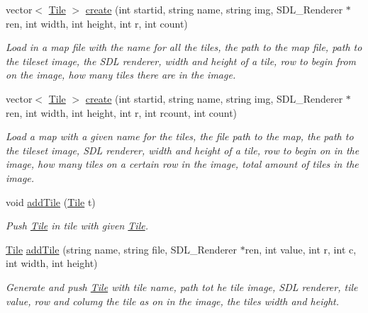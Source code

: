 \begin{DoxyCompactItemize}
\mbox{\label{classTileset_a9d93cb00fc20938748075d94be118ed6}} 
vector$<$ \hyperlink{classTile}{Tile} $>$ \hyperlink{classTileset_a9d93cb00fc20938748075d94be118ed6}{create} (int startid, string name, string img, S\+D\+L\+\_\+\+Renderer $\ast$ren, int width, int height, int r, int count)
\begin{DoxyCompactList}\small\item\em Load in a map file with the name for all the tiles, the path to the map file, path to the tileset image, the S\+DL renderer, width and height of a tile, row to begin from on the image, how many tiles there are in the image. \end{DoxyCompactList}\item 
\mbox{\label{classTileset_a7671c66fd7dfd4cf62524a5d518afbe6}} 
vector$<$ \hyperlink{classTile}{Tile} $>$ \hyperlink{classTileset_a7671c66fd7dfd4cf62524a5d518afbe6}{create} (int startid, string name, string img, S\+D\+L\+\_\+\+Renderer $\ast$ren, int width, int height, int r, int rcount, int count)
\begin{DoxyCompactList}\small\item\em Load a map with a given name for the tiles, the file path to the map, the path to the tileset image, S\+DL renderer, width and height of a tile, row to begin on in the image, how many tiles on a certain row in the image, total amount of tiles in the image. \end{DoxyCompactList}\item 
\mbox{\label{classTileset_a26acaabd06601aba2e277fdd2b750fc7}} 
void \hyperlink{classTileset_a26acaabd06601aba2e277fdd2b750fc7}{add\+Tile} (\hyperlink{classTile}{Tile} t)
\begin{DoxyCompactList}\small\item\em Push \hyperlink{classTile}{Tile} in tile with given \hyperlink{classTile}{Tile}. \end{DoxyCompactList}\item 
\mbox{\label{classTileset_aea4085286f450afdb53b22c917a77cba}} 
\hyperlink{classTile}{Tile} \hyperlink{classTileset_aea4085286f450afdb53b22c917a77cba}{add\+Tile} (string name, string file, S\+D\+L\+\_\+\+Renderer $\ast$ren, int value, int r, int c, int width, int height)
\begin{DoxyCompactList}\small\item\em Generate and push \hyperlink{classTile}{Tile} with tile name, path tot he tile image, S\+DL renderer, tile value, row and columg the tile as on in the image, the tiles width and height. \end{DoxyCompactList}\item 

\end{DoxyCompactItemize}
